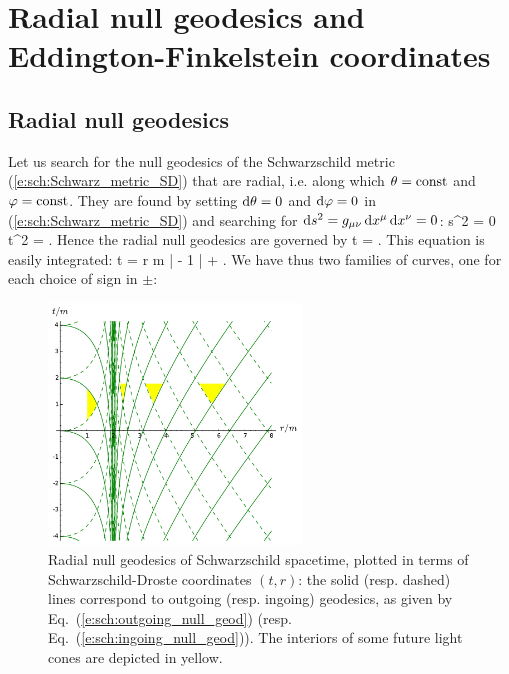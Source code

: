 
\section{Radial null geodesics and Eddington-Finkelstein coordinates}
\label{s:sch:rad_geod_EF}

\subsection{Radial null geodesics}
\label{s:sch:rad_null_geod}

Let us search for the null geodesics of the Schwarzschild metric
(\ref{e:sch:Schwarz_metric_SD}) that are radial, i.e. along which
$\theta=\mathrm{const}$ and $\varphi=\mathrm{const}$. They are found by
setting  $\mathrm{d}\theta=0$ and $\mathrm{d}\varphi=0$
in (\ref{e:sch:Schwarz_metric_SD})
and searching for $\mathrm{d} s^2 = g_{\mu\nu}\, \mathrm{d} x^\mu \, \mathrm{d} x^\nu = 0$:
\be \label{e:sch:radial_null}
    \D s^2 = 0 \iff \D t^2 =  .
\ee
Hence the radial null geodesics are governed by
\be
    \D t = \pm {} .
\ee
This equation is easily integrated:
\be
    t = \pm r  m \ln \left|  - 1 \right| +  .
\ee
We have thus two families of curves, one for each choice
of sign in $\pm$:

\begin{figure}
\centerline{\includegraphics[width=0.6\textwidth]{sch_rad_null_geod.pdf}}
\caption[]{\label{f:sch:rad_null_geod} \footnotesize
Radial null geodesics of Schwarzschild spacetime, plotted in terms
of Schwarzschild-Droste coordinates $(t,r)$: the solid (resp. dashed) lines
correspond to outgoing (resp. ingoing) geodesics, as given by Eq.~(\ref{e:sch:outgoing_null_geod})
(resp. Eq.~(\ref{e:sch:ingoing_null_geod})). The interiors of some future light
cones are depicted in yellow.}
\end{figure}

